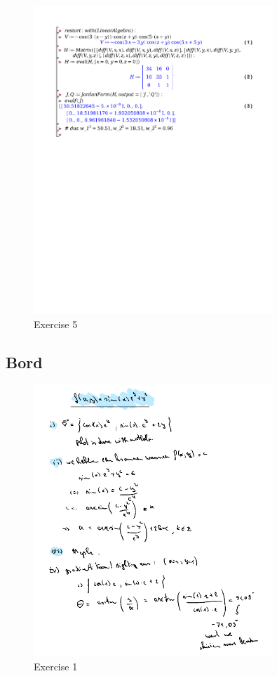 \documentclass[a4paper]{report}
\begin{document}
\begin{figure}[H]
	\centering
	\includegraphics[width=0.8\textwidth]{exercises/huis_4_ex_5.pdf}
	\caption{Exercise 5}
	\label{fig:huis_4_ex_5}
\end{figure}

\subsection{Bord}

\begin{figure}[H]
	\centering
	\includegraphics[width=0.8\textwidth]{assets/bord_4_ex_1.png}
	\caption{Exercise 1}
	\label{fig:bord_4_ex_1}
\end{figure}
\end{document}
